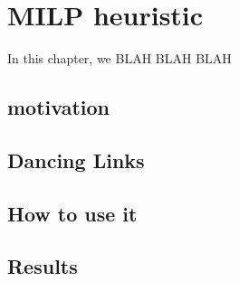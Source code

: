 \chapter{MILP heuristic}
\label{ch:dancingLinks} 
   
   In this chapter, we BLAH BLAH BLAH
   
\section{motivation}

\section{Dancing Links}

\section{How to use it}

\section{Results}